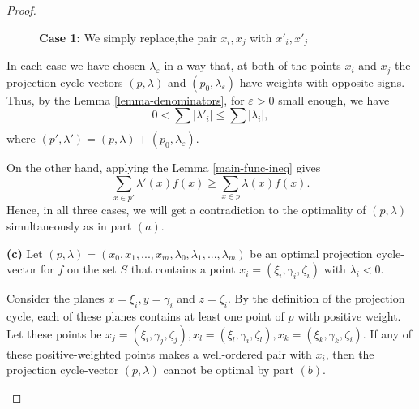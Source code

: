 \documentclass[12p]{article}
\numberwithin{equation}{section}
\begin{document}
\begin{proof}
\begin{figure}[ht]
    \caption{\textbf{Case 1:} We simply replace,the pair \(x_i,x_j\) with \(x'_i,x'_j\) }
\end{figure}

    In each case we have chosen \(\lambda_\varepsilon\) in a way that, at both of the points \(x_i\) and \(x_j\) the projection cycle-vectors \((p,\lambda)\) and \((p_0,\lambda_\varepsilon)\) have weights with opposite signs. Thus, by the Lemma \ref{lemma-denominators}, for \(\varepsilon>0\) small enough, we have 
    \[
    0 < \sum_{}|\lambda'_i| \le  \sum|\lambda_i|,
    \]
where \((p',\lambda')=(p,\lambda)+(p_0,\lambda_\varepsilon)\).

On the other hand, applying the Lemma \ref{main-func-ineq} gives
\[
\sum_{x \in p'}\lambda'(x)f(x) \ge \sum_{x \in p}\lambda(x)f(x).
\]
Hence, in all three cases, we will get a contradiction to the optimality of \((p,\lambda)\) simultaneously as in part \((a)\).


\textbf{(c)} Let \((p,\lambda)=(x_0,x_1,...,x_m,\lambda_0,\lambda_1,...,\lambda_m)\) be an optimal projection cycle-vector for \(f\) on the set \(S\) that contains a point \(x_i=(\xi_i,\gamma_i,\zeta_i)\) with \(\lambda_i<0\).

Consider the planes \(x=\xi_i,y=\gamma_i\) and \(z=\zeta_i\). By the definition of the projection cycle, each of these planes contains at least one point of \(p\) with positive weight. Let these points be \(x_j=(\xi_i,\gamma_j,\zeta_j),x_l=(\xi_l,\gamma_i,\zeta_l),x_k=(\xi_k,\gamma_k,\zeta_i)\).
If any of these positive-weighted points makes a well-ordered pair with \(x_i\), then the projection cycle-vector \((p,\lambda)\) cannot be optimal by part \((b)\). 
\begin{figure}[ht]
        \centering
\end{figure}
\end{proof}
\end{document}
